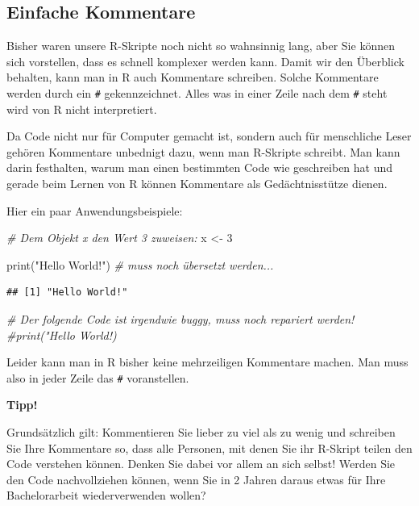 \documentclass[
]{book}
\newenvironment{Shaded}{\begin{snugshade}}{\end{snugshade}}
\newcommand{\CommentTok}[1]{\textcolor[rgb]{0.56,0.35,0.01}{\textit{#1}}}
\newcommand{\DecValTok}[1]{\textcolor[rgb]{0.00,0.00,0.81}{#1}}
\newcommand{\FunctionTok}[1]{\textcolor[rgb]{0.00,0.00,0.00}{#1}}
\newcommand{\NormalTok}[1]{#1}
\newcommand{\OtherTok}[1]{\textcolor[rgb]{0.56,0.35,0.01}{#1}}
\newcommand{\StringTok}[1]{\textcolor[rgb]{0.31,0.60,0.02}{#1}}
\begin{document}
\hypertarget{einfache-kommentare}{%
\subsection{Einfache Kommentare}\label{einfache-kommentare}}

Bisher waren unsere R-Skripte noch nicht so wahnsinnig lang, aber Sie können sich vorstellen, dass es schnell komplexer werden kann. Damit wir den Überblick behalten, kann man in R auch Kommentare schreiben. Solche Kommentare werden durch ein \texttt{\#} gekennzeichnet. Alles was in einer Zeile nach dem \texttt{\#} steht wird von R nicht interpretiert.

Da Code nicht nur für Computer gemacht ist, sondern auch für menschliche Leser gehören Kommentare unbednigt dazu, wenn man R-Skripte schreibt. Man kann darin festhalten, warum man einen bestimmten Code wie geschreiben hat und gerade beim Lernen von R können Kommentare als Gedächtnisstütze dienen.

Hier ein paar Anwendungsbeispiele:

\begin{Shaded}
\begin{Highlighting}[]
\CommentTok{\# Dem Objekt x den Wert 3 zuweisen:}
\NormalTok{x }\OtherTok{\textless{}{-}} \DecValTok{3}

\FunctionTok{print}\NormalTok{(}\StringTok{"Hello World!"}\NormalTok{) }\CommentTok{\# muss noch übersetzt werden...}
\end{Highlighting}
\end{Shaded}

\begin{verbatim}
## [1] "Hello World!"
\end{verbatim}

\begin{Shaded}
\begin{Highlighting}[]
\CommentTok{\# Der folgende Code ist irgendwie buggy, muss noch repariert werden!}
\CommentTok{\#print("Hello World!)}
\end{Highlighting}
\end{Shaded}

Leider kann man in R bisher keine mehrzeiligen Kommentare machen. Man muss also in jeder Zeile das \texttt{\#} voranstellen.

\textbf{Tipp!}

Grundsätzlich gilt: Kommentieren Sie lieber zu viel als zu wenig und schreiben Sie Ihre Kommentare so, dass alle Personen, mit denen Sie ihr R-Skript teilen den Code verstehen können. Denken Sie dabei vor allem an sich selbst! Werden Sie den Code nachvollziehen können, wenn Sie in 2 Jahren daraus etwas für Ihre Bachelorarbeit wiederverwenden wollen?
\end{document}
